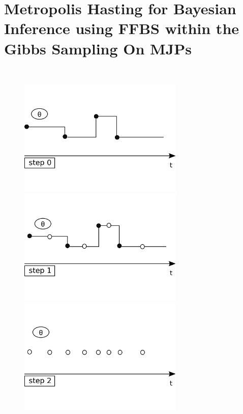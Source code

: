 \section{Metropolis Hasting for Bayesian Inference using FFBS  within the Gibbs Sampling On MJPs}~

\setlength{\unitlength}{0.8cm}
  \begin{figure}[H]
  \centering
  \begin{minipage}[!hp]{0.45\linewidth}
  \centering
    \includegraphics [width=0.70\textwidth, angle=0]{figs/plotn0.pdf}
      \end{minipage}
  \begin{minipage}[!hp]{0.45\linewidth}
  \centering
    \includegraphics [width=0.70\textwidth, angle=0]{figs/plotn1.pdf}
    \vspace{-0 in}
  \end{minipage}
  \begin{minipage}[!hp]{0.45\linewidth}
  \centering
    \includegraphics [width=0.70\textwidth, angle=0]{figs/plotn2.pdf}

\end{minipage}
\end{figure}
